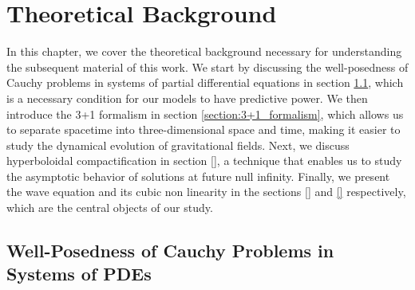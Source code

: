 
\chapter{Theoretical Background}
\label{chapter:background}

In this chapter, we cover the theoretical background necessary for understanding the subsequent material of this work. We start by discussing the well-posedness of Cauchy problems in systems of partial differential equations in section \ref{section:well-posedness}, which is a necessary condition for our models to have predictive power. We then introduce the 3+1 formalism in section \ref{section:3+1_formalism}, which allows us to separate spacetime into three-dimensional space and time, making it easier to study the dynamical evolution of gravitational fields. Next, we discuss hyperboloidal compactification in section \ref{}, a technique that enables us to study the asymptotic behavior of solutions at future null infinity. Finally, we present the wave equation and its cubic non linearity in the sections \ref{} and \ref{} respectively, which are the central objects of our study.


\section{Well-Posedness of Cauchy Problems in Systems of PDEs}
\label{section:well-posedness}

